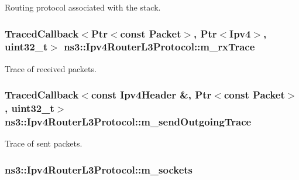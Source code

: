 Routing protocol associated with the stack. 

\hypertarget{classns3_1_1Ipv4RouterL3Protocol_a8f30202038799f4581a8339378012995}{
\subsubsection[{m\-\_\-rx\-Trace}]{\setlength{\rightskip}{0pt plus 5cm}Traced\-Callback$<$Ptr$<$const Packet$>$, Ptr$<$Ipv4$>$, uint32\-\_\-t$>$ ns3\-::\-Ipv4\-Router\-L3\-Protocol\-::m\-\_\-rx\-Trace\hspace{0.3cm}{\ttfamily [private]}}}\label{classns3_1_1Ipv4RouterL3Protocol_a8f30202038799f4581a8339378012995}


Trace of received packets. 

\hypertarget{classns3_1_1Ipv4RouterL3Protocol_a43fe32063af9622684b6567a6319ac73}{
\subsubsection[{m\-\_\-send\-Outgoing\-Trace}]{\setlength{\rightskip}{0pt plus 5cm}Traced\-Callback$<$const Ipv4\-Header \&, Ptr$<$const Packet$>$, uint32\-\_\-t$>$ ns3\-::\-Ipv4\-Router\-L3\-Protocol\-::m\-\_\-send\-Outgoing\-Trace\hspace{0.3cm}{\ttfamily [private]}}}\label{classns3_1_1Ipv4RouterL3Protocol_a43fe32063af9622684b6567a6319ac73}


Trace of sent packets. 

\hypertarget{classns3_1_1Ipv4RouterL3Protocol_aa0d8fc6efa8a5785ec656e2ecb5c2489}{
\subsubsection[{m\-\_\-sockets}]{ ns3\-::\-Ipv4\-Router\-L3\-Protocol\-::m\-\_\-sockets\hspace{0.3cm}{\ttfamily [private]}}}\label{classns3_1_1Ipv4RouterL3Protocol_aa0d8fc6efa8a5785ec656e2ecb5c2489}


